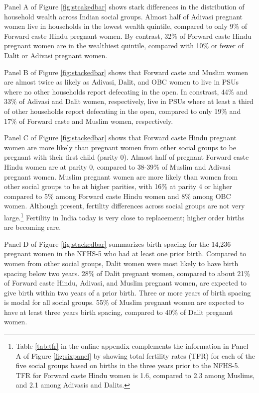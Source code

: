\documentclass[12pt]{article}
\begin{document}
Panel A of Figure \ref{fig:stcakedbar} shows stark differences in the distribution of household wealth across Indian social groups. Almost half of Adivasi pregnant women live in households in the lowest wealth quintile, compared to only 9\% of Forward caste Hindu pregnant women. By contrast, 32\% of Forward caste Hindu pregnant women are in the wealthiest quintile, compared with 10\% or fewer of Dalit or Adivasi pregnant women. 

Panel B of Figure \ref{fig:stackedbar} shows that Forward caste and Muslim women are almost twice as likely as Adivasi, Dalit, and OBC women to live in PSUs where no other households report defecating in the open. In constrast, 44\% and 33\% of Adivasi and Dalit women, respectively, live in PSUs where at least a third of other households report defecating in the open, compared to only 19\% and 17\% of Forward caste and Muslim women, respectively. 

Panel C of Figure \ref{fig:stackedbar} shows that Forward caste Hindu pregnant women are more likely than pregnant women from other social groups to be pregnant with their first child (parity 0). Almost half of pregnant Forward caste Hindu women are at parity 0, compared to 38-39\% of Muslim and Adivasi pregnant women. Muslim pregnant women are more likely than women from other social groups to be at higher parities, with 16\% at parity 4 or higher compared to 5\% among Forward caste Hindu women and 8\% among OBC women. Although present, fertility differences across social groups are not very large.\footnote{Table \ref{tab:tfr} in the online appendix complements the information in Panel A of Figure \ref{fig:sixpanel} by showing total fertility rates (TFR) for each of the five social groups based on births in the three years prior to the NFHS-5.  TFR for Forward caste Hindu women is 1.6, compared to 2.3 among Muslims, and 2.1 among Adivasis and Dalits.}  Fertility in India today is very close to replacement; higher order births are becoming rare.

Panel D of Figure \ref{fig:stackedbar} summarizes birth spacing for the 14,236 pregnant women in the NFHS-5 who had at least one prior birth.  Compared to women from other social groups, Dalit women were most likely to have birth spacing below two years.  28\% of Dalit pregnant women, compared to about 21\% of Forward caste Hindu, Adivasi, and Muslim pregnant women, are expected to give birth within two years of a prior birth.  Three or more years of birth spacing is modal for all social groups.  55\% of Muslim pregnant women are expected to have at least three years birth spacing, compared to 40\% of Dalit pregnant women. 
\end{document}
